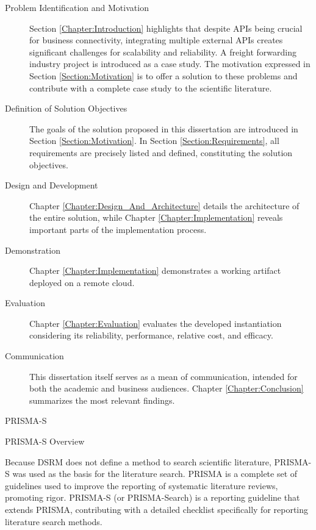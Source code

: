 \documentclass[12pt,reqno, oneside]{amsbook}
\makeatletter
\def\section{\@startsection{section}{1}%
      \z@{.5\linespacing\@plus.7\linespacing}{.25\linespacing}%
      {\normalfont\bfseries\flushleft}}
\def\subsection{\@startsection{subsection}{2}%
      \z@{.5\linespacing\@plus.7\linespacing}{.25\linespacing}%
      {\normalfont\bfseries\flushleft}}
\theoremstyle{definition}
\theoremstyle{definition}
\numberwithin{section}{chapter}
\numberwithin{table}{chapter}
\numberwithin{figure}{chapter}
\makeatother
\begin{document}
\begin{description}
  \item [Problem Identification and Motivation] Section \ref{Chapter:Introduction} highlights that despite \acp{API} being crucial for business connectivity, integrating multiple external \acp{API} creates significant challenges for scalability and reliability. A freight forwarding industry project is introduced as a case study. The motivation expressed in Section \ref{Section:Motivation} is to offer a solution to these problems and contribute with a complete case study to the scientific literature.
  \item [Definition of Solution Objectives] The goals of the solution proposed in this dissertation are introduced in Section \ref{Section:Motivation}. In Section \ref{Section:Requirements}, all requirements are precisely listed and defined, constituting the solution objectives.
  \item [Design and Development] Chapter \ref{Chapter:Design_And_Architecture} details the architecture of the entire solution, while Chapter \ref{Chapter:Implementation} reveals important parts of the implementation process.
  \item [Demonstration] Chapter \ref{Chapter:Implementation} demonstrates a working artifact deployed on a remote cloud.
  \item [Evaluation] Chapter \ref{Chapter:Evaluation} evaluates the developed instantiation considering its reliability, performance, relative cost, and efficacy.
  \item [Communication] This dissertation itself serves as a mean of communication, intended for both the academic and business audiences. Chapter \ref{Chapter:Conclusion} summarizes the most relevant findings.
\end{description}

\section{PRISMA-S}

\subsection{PRISMA-S Overview}
\label{Subsection:PRISMA_S_Overview}

Because \ac{DSRM} does not define a method to search scientific literature, PRISMA-S was used as the basis for the literature search. \ac{PRISMA} is a complete set of guidelines used to improve the reporting of systematic literature reviews, promoting rigor. PRISMA-S (or PRISMA-Search) is a reporting guideline that extends PRISMA, contributing with a detailed checklist specifically for reporting literature search methods.
\end{document}
